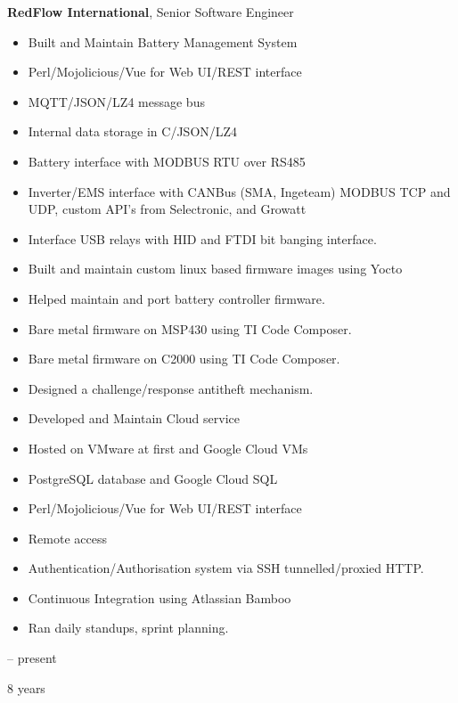 \documentclass[12pt, a4paper]{article}
\newenvironment{highlights}{
    \begin{itemize}[
        topsep=0.10 cm,
        parsep=0.10 cm,
        partopsep=0pt,
        itemsep=0pt,
        leftmargin=0.4 cm + 10pt
    ]
}{
    \end{itemize}
} %
\newenvironment{twocolentry}[2][]{
    \onecolentry
    \def\secondColumn{#2}
    \setcolumnwidth{\fill, 4.5 cm}
    \begin{paracol}{2}
}{
    \switchcolumn \raggedleft \secondColumn
    \end{paracol}
    \endonecolentry
} %
\begin{document}
        
        \begin{twocolentry}{
            2016 – present

        8 years
        }
            \textbf{RedFlow International}, Senior Software Engineer
            \begin{highlights}
                \item Built and Maintain Battery Management System
                \item Perl/Mojolicious/Vue for Web UI/REST interface
                \item MQTT/JSON/LZ4 message bus
                \item Internal data storage in C/JSON/LZ4
                \item Battery interface with MODBUS RTU over RS485
                \item Inverter/EMS interface with CANBus (SMA, Ingeteam) MODBUS TCP and UDP, custom API’s from Selectronic, and Growatt
                \item Interface USB relays with HID and FTDI bit banging interface.
                \item Built and maintain custom linux based firmware images using Yocto
                \item Helped maintain and port battery controller firmware.
                \item Bare metal firmware on MSP430 using TI Code Composer.
                \item Bare metal firmware on C2000 using TI Code Composer.
                \item Designed a challenge/response antitheft mechanism.
                \item Developed and Maintain Cloud service
                \item Hosted on VMware at first and Google Cloud VMs
                \item PostgreSQL database and Google Cloud SQL
                \item Perl/Mojolicious/Vue for Web UI/REST interface
                \item Remote access
                \item Authentication/Authorisation system via SSH tunnelled/proxied HTTP.
                \item Continuous Integration using Atlassian Bamboo
                \item Ran daily standups, sprint planning.
            \end{highlights}
        \end{twocolentry}
\end{document}
